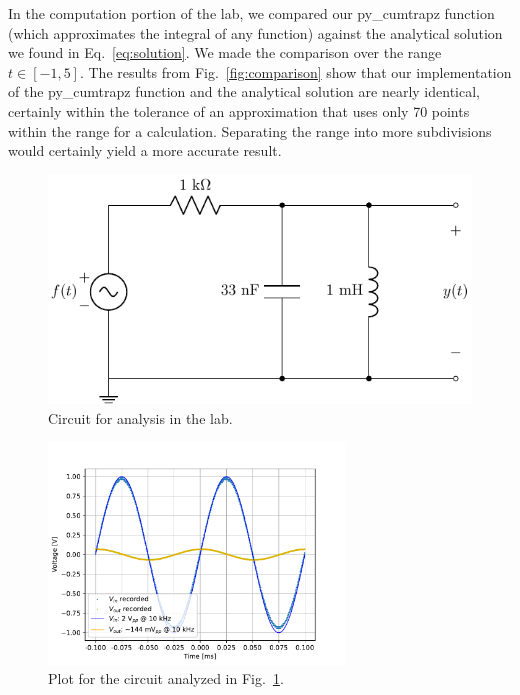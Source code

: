 \documentclass[11pt]{texMemo-gibbons}
\begin{document}
In the computation portion of the lab, we compared our
py\_cumtrapz function (which approximates the integral
of any function) against the analytical solution we
found in Eq.~\ref{eq:solution}. We made the comparison
over the range $t \in [-1,5]$. The results from Fig.~\ref{fig:comparison}
show that our implementation of the py\_cumtrapz function
and the analytical solution are nearly identical, certainly within
the tolerance of an approximation that uses only 70 points within
the range for a calculation. Separating the range into more subdivisions
would certainly yield a more accurate result.

\clearpage

\begin{figure}[h!]
  \centering
  \includegraphics{circuits/circuit_01.pdf}
  \caption{Circuit for analysis in the lab.}
  \label{fig:circuit01}
\end{figure}

\begin{figure}[h!]
  \centering
  \includegraphics[width=0.7\textwidth]{plots/circuit_analysis.pdf}
  \caption{Plot for the circuit analyzed in Fig.~\ref{fig:circuit01}.}
  \label{fig:plots01}
\end{figure}
\end{document}
